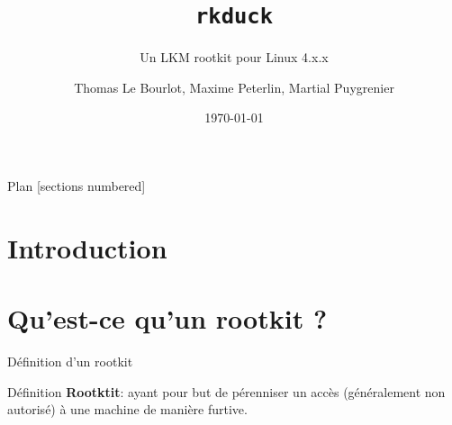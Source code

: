 \documentclass[10pt]{beamer}
\title{\texttt{rkduck}}
\subtitle{Un LKM rootkit pour Linux 4.x.x}
\date{\today}
\author{Thomas Le Bourlot, Maxime Peterlin, Martial Puygrenier}
\institute{Université de Bordeaux}
\begin{document}
\maketitle

\begin{frame}{Plan}
  [sections numbered]
  \tableofcontents[hideallsubsections]
\end{frame}

\section*{Introduction}


\section{Qu'est-ce qu'un rootkit ?}


	

	\begin{frame}{Définition d'un rootkit}
	
	\begin{alertblock}{Définition}
		\textbf{Rootktit}:  ayant pour but de pérenniser un accès (généralement non autorisé) à une machine de manière furtive.
    \end{alertblock}
    
	\end{frame}
	
\end{document}
